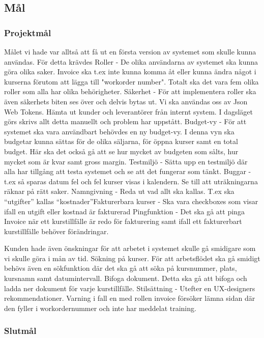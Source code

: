 \documentclass{article}
\begin{document}
    \subsection{Mål}
        \subsubsection{Projektmål}
        Målet vi hade var alltså att få ut en första version av systemet som
skulle kunna användas. För detta krävdes Roller - De olika användarna av
systemet ska kunna göra olika saker. Invoice ska t.ex inte kunna komma åt eller
kunna ändra något i kurserna förutom att lägga till "workorder number". Totalt
ska det vara fem olika roller som alla har olika behörigheter. Säkerhet - För
att implementera roller ska även säkerhets biten ses över och delvis bytas ut.
Vi ska användas oss av Json Web Tokens. Hämta ut kunder och leverantörer från
internt system. I dagsläget görs skrivs allt detta manuellt och problem har
uppstått. Budget-vy - För att systemet ska vara användbart behövdes en ny
budget-vy. I denna vyn ska budgetar kunna sättas för de olika säljarna, för
öppna kurser samt en total budget. Här ska det också gå att se hur mycket av
budgeten som sålts, hur mycket som är kvar samt gross margin. Testmiljö - Sätta
upp en testmiljö där alla har tillgång att testa systemet och se att det
fungerar som tänkt. Buggar - t.ex så sparas datum fel och fel kurser visas i
kalendern. Se till att uträkningarna räknar på rätt saker. Namngivning - Reda ut
vad allt ska kallas. T.ex ska “utgifter” kallas “kostnader”Fakturerbara kurser -
Ska vara checkboxes som visar ifall en utgift eller kostnad är fakturerad
Pingfunktion - Det ska gå att pinga Invoice när ett kurstillfälle är redo för
fakturering samt ifall ett fakturerbart kurstillfälle behöver förändringar.

Kunden hade även önskningar för att arbetet i systemet skulle gå smidigare som
vi skulle göra i mån av tid. Sökning på kurser. För att arbetsflödet ska gå
smidigt behövs även en sökfunktion där det ska gå att söka på kursnummer, plats,
kursnamn samt datumintervall. Bifoga dokument. Detta ska gå att bifoga och ladda
ner dokument för varje kurstillfälle. Stilsättning - Utefter en UX-designers
rekommendationer. Varning i fall en med rollen invoice försöker lämna sidan där
den fyller i workordernummer och inte har meddelat training.

        \subsubsection{Slutmål}
\end{document}
